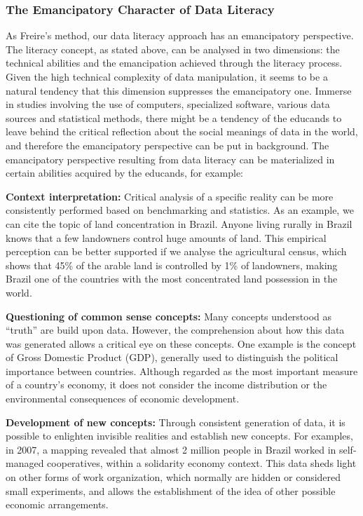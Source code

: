 \subsubsection{The Emancipatory Character of Data Literacy}
As Freire's method, our data literacy approach has an emancipatory perspective. The literacy concept, as stated above, can be analysed in two dimensions: the technical abilities and the emancipation achieved through the literacy process. Given the high technical complexity of data manipulation, it seems to be a natural tendency that this dimension suppresses the emancipatory one. Immerse in studies involving the use of computers, specialized software, various data sources and statistical methods, there might be a tendency of the educands to leave behind the critical reflection about the social meanings of data in the world, and therefore the emancipatory perspective can be put in background. The emancipatory perspective resulting from data literacy can be materialized in certain abilities acquired by the educands, for example: 

\noindent \textbf{Context interpretation:} Critical analysis of a specific reality can be more consistently performed based on benchmarking and statistics. As an example, we can cite the topic of land concentration in Brazil. Anyone living rurally in Brazil knows that a few landowners control huge amounts of land. This empirical perception can be better supported if we analyse the agricultural census, which shows that 45\% of the arable land is controlled by 1\% of landowners, making Brazil one of the countries with the most concentrated land possession in the world.

\noindent \textbf{Questioning of common sense concepts:} Many concepts understood as “truth” are build upon data. However, the comprehension about how this data was generated allows a critical eye on these concepts. One example is the concept of Gross Domestic Product (GDP), generally used to distinguish the political importance between countries. Although regarded as the most important measure of a country's economy, it does not consider the income distribution or the environmental consequences of economic development.

\noindent \textbf{Development of new concepts:} Through consistent generation of data, it is possible to enlighten invisible realities and establish new concepts. For examples, in 2007, a mapping revealed that almost 2 million people in Brazil worked in self-managed cooperatives, within a solidarity economy context. This data sheds light on other forms of work organization, which normally are hidden or considered small experiments, and allows the establishment of the idea of other possible economic arrangements.

